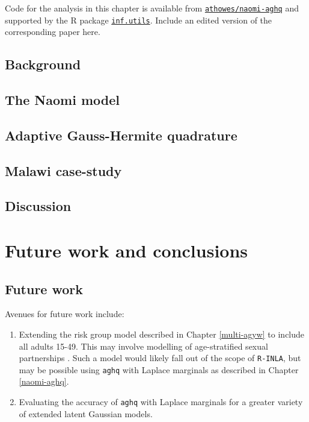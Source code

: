 \documentclass[a4paper, nobind]{templates/ociamthesis}
\providecommand{\tightlist}{%
  \setlength{\itemsep}{0pt}\setlength{\parskip}{0pt}}
\begin{document}
\adjustmtc
{}

Code for the analysis in this chapter is available from \href{https://github.com/athowes/elgm-inf}{\texttt{athowes/naomi-aghq}} and supported by the R package \href{https://athowes.github.io/inf.utils}{\texttt{inf.utils}}.
Include an edited version of the corresponding paper here.

\hypertarget{background-3}{%
\section{Background}\label{background-3}}

\hypertarget{the-naomi-model}{%
\section{The Naomi model}\label{the-naomi-model}}

\hypertarget{adaptive-gauss-hermite-quadrature}{%
\section{Adaptive Gauss-Hermite quadrature}\label{adaptive-gauss-hermite-quadrature}}

\hypertarget{malawi-case-study}{%
\section{Malawi case-study}\label{malawi-case-study}}

\hypertarget{discussion-2}{%
\section{Discussion}\label{discussion-2}}

\hypertarget{conclusions}{%
\chapter{Future work and conclusions}\label{conclusions}}

\adjustmtc
{}

\hypertarget{future-work}{%
\section{Future work}\label{future-work}}

Avenues for future work include:

\begin{enumerate}
\def\labelenumi{\arabic{enumi}.}
\tightlist
\item
  Extending the risk group model described in Chapter \ref{multi-agyw} to include all adults 15-49. This may involve modelling of age-stratified sexual partnerships \autocite{wolock2021evaluating}. Such a model would likely fall out of the scope of \texttt{R-INLA}, but may be possible using \texttt{aghq} with Laplace marginals as described in Chapter \ref{naomi-aghq}.
\item
  Evaluating the accuracy of \texttt{aghq} with Laplace marginals for a greater variety of extended latent Gaussian models.
\end{enumerate}
\end{document}
